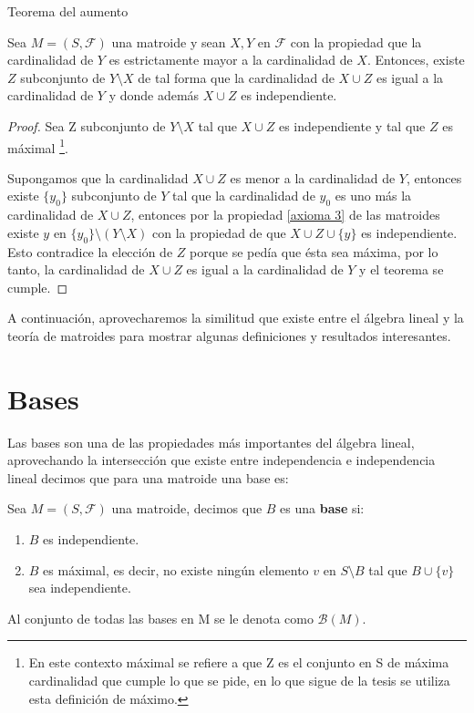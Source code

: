 \begin{teo}{Teorema del aumento} \label{augmentation}

Sea $M=(S,\mathcal{F})$ una matroide y sean $X,Y$ en $\mathcal{F}$ con la propiedad que la cardinalidad de $Y$ es estrictamente mayor a la cardinalidad de $X$. Entonces, existe $Z$ subconjunto de $Y \setminus X$ de tal forma que la cardinalidad de $X \cup Z$ es igual a la cardinalidad de $Y$ y donde además $X \cup Z$ es independiente. 
\end{teo}
\begin{proof}
Sea Z subconjunto de $Y \setminus X$ tal que $X \cup Z$ es independiente y tal que $Z$ es máximal \footnote{En este contexto máximal se refiere a que Z es el conjunto en S de máxima cardinalidad que cumple lo que se pide, en lo que sigue de la tesis se utiliza esta definición de máximo.}. 
 
Supongamos que la cardinalidad $X \cup Z$ es menor a la cardinalidad de $Y$, entonces existe $\{y_0\}$ subconjunto de $Y$ tal que la cardinalidad de $y_0$ es uno más la cardinalidad de $X \cup Z$, entonces por la propiedad \ref{axioma 3} de las matroides existe $y$ en $\{y_0\} \setminus (Y \setminus X)$ con la propiedad de que $X \cup Z \cup \{ y\}$ es independiente. Esto contradice la elección de $Z$ porque se pedía que ésta sea máxima, por lo tanto, la cardinalidad de $X \cup Z$ es igual a la cardinalidad de $Y$ y el teorema se cumple. 
\end{proof}

A continuación, aprovecharemos la similitud que existe entre el álgebra lineal y la teoría de matroides para mostrar algunas definiciones y resultados interesantes. 

\section{Bases}

Las bases son una de las propiedades más importantes del álgebra lineal, aprovechando la intersección que existe entre independencia e independencia lineal decimos que para una matroide una base es: 

\begin{dfn}
Sea $M=(S,\mathcal{F})$ una matroide, decimos que ${B}$ es una \textbf{base} si:
\begin{enumerate}
\item ${B}$ es independiente.
\item ${B}$ es máximal, es decir, no existe ningún elemento $v$ en $S \setminus {B}$ tal que ${B} \cup \{v\}$ sea independiente.
\end{enumerate}
Al conjunto de todas las bases en M se le denota como $\mathcal{B}(M)$.
\end{dfn}

